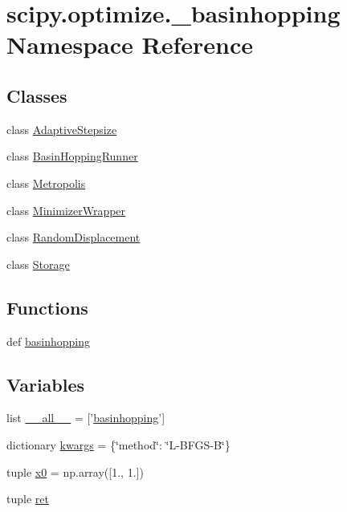 \hypertarget{namespacescipy_1_1optimize_1_1__basinhopping}{}\section{scipy.\+optimize.\+\_\+basinhopping Namespace Reference}
\label{namespacescipy_1_1optimize_1_1__basinhopping}
\subsection*{Classes}
\begin{DoxyCompactItemize}
\item 
class \hyperlink{classscipy_1_1optimize_1_1__basinhopping_1_1AdaptiveStepsize}{Adaptive\+Stepsize}
\item 
class \hyperlink{classscipy_1_1optimize_1_1__basinhopping_1_1BasinHoppingRunner}{Basin\+Hopping\+Runner}
\item 
class \hyperlink{classscipy_1_1optimize_1_1__basinhopping_1_1Metropolis}{Metropolis}
\item 
class \hyperlink{classscipy_1_1optimize_1_1__basinhopping_1_1MinimizerWrapper}{Minimizer\+Wrapper}
\item 
class \hyperlink{classscipy_1_1optimize_1_1__basinhopping_1_1RandomDisplacement}{Random\+Displacement}
\item 
class \hyperlink{classscipy_1_1optimize_1_1__basinhopping_1_1Storage}{Storage}
\end{DoxyCompactItemize}
\subsection*{Functions}
\begin{DoxyCompactItemize}
\item 
def \hyperlink{namespacescipy_1_1optimize_1_1__basinhopping_a33599dd3a1af47882707303ea89bb036}{basinhopping}
\end{DoxyCompactItemize}
\subsection*{Variables}
\begin{DoxyCompactItemize}
\item 
list \hyperlink{namespacescipy_1_1optimize_1_1__basinhopping_a47ca6452454c4eae46b270e28300380e}{\+\_\+\+\_\+all\+\_\+\+\_\+} = \mbox{[}'\hyperlink{namespacescipy_1_1optimize_1_1__basinhopping_a33599dd3a1af47882707303ea89bb036}{basinhopping}'\mbox{]}
\item 
dictionary \hyperlink{namespacescipy_1_1optimize_1_1__basinhopping_af1073cfc3f47000d71431e4d4f033b21}{kwargs} = \{\char`\"{}method\char`\"{}\+: \char`\"{}L-\/B\+F\+G\+S-\/B\char`\"{}\}
\item 
tuple \hyperlink{namespacescipy_1_1optimize_1_1__basinhopping_adf49b15a9ea81879b1d8991926e3c150}{x0} = np.\+array(\mbox{[}1., 1.\mbox{]})
\item 
tuple \hyperlink{namespacescipy_1_1optimize_1_1__basinhopping_aa266e39b61ee46db97b8c3949e6fff22}{ret}
\end{DoxyCompactItemize}


